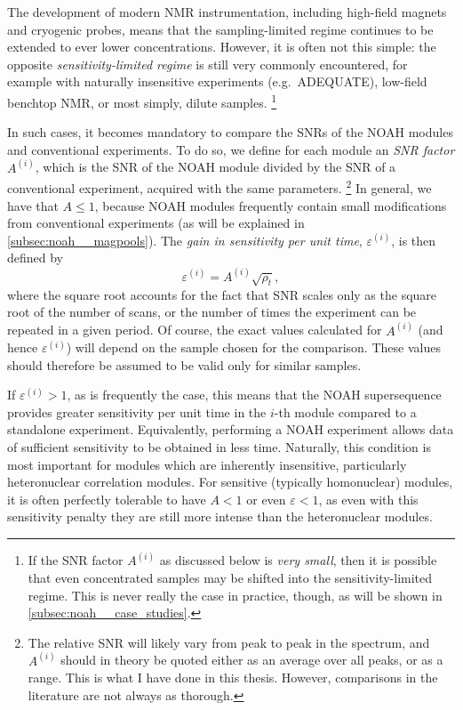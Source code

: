 The development of modern NMR instrumentation, including high-field magnets and cryogenic probes, means that the sampling-limited regime continues to be extended to ever lower concentrations.
However, it is often not this simple: the opposite \textit{sensitivity-limited regime} is still very commonly encountered, for example with naturally insensitive experiments (e.g.\ ADEQUATE), low-field benchtop NMR, or most simply, dilute samples.%
\footnote{If the SNR factor $A^{(i)}$ as discussed below is \textit{very small}, then it is possible that even concentrated samples may be shifted into the sensitivity-limited regime. This is never really the case in practice, though, as will be shown in \cref{subsec:noah__case_studies}.}

In such cases, it becomes mandatory to compare the SNRs of the NOAH modules and conventional experiments.
To do so, we define for each module an \textit{SNR factor} $A^{(i)}$, which is the SNR of the NOAH module divided by the SNR of a conventional experiment, acquired with the same parameters.%
\footnote{The relative SNR will likely vary from peak to peak in the spectrum, and $A^{(i)}$ should in theory be quoted either as an average over all peaks, or as a range. This is what I have done in this thesis. However, comparisons in the literature are not always as thorough.}
In general, we have that $A \leq 1$, because NOAH modules frequently contain small modifications from conventional experiments (as will be explained in \cref{subsec:noah__magpools}).
The \textit{gain in sensitivity per unit time}, $\varepsilon^{(i)}$, is then defined by
\begin{equation}
    \label{eq:varepsilon_i}
    \varepsilon^{(i)} = A^{(i)} \sqrt{\rho_t},
\end{equation}
where the square root accounts for the fact that SNR scales only as the square root of the number of scans, or the number of times the experiment can be repeated in a given period.
Of course, the exact values calculated for $A^{(i)}$ (and hence $\varepsilon^{(i)}$) will depend on the sample chosen for the comparison.
These values should therefore be assumed to be valid only for similar samples.

If $\varepsilon^{(i)} > 1$, as is frequently the case, this means that the NOAH supersequence provides greater sensitivity per unit time in the $i$-th module compared to a standalone experiment.
Equivalently, performing a NOAH experiment allows data of sufficient sensitivity to be obtained in less time.
Naturally, this condition is most important for modules which are inherently insensitive, particularly heteronuclear correlation modules.
For sensitive (typically homonuclear) modules, it is often perfectly tolerable to have $A < 1$ or even $\varepsilon < 1$, as even with this sensitivity penalty they are still more intense than the heteronuclear modules.


